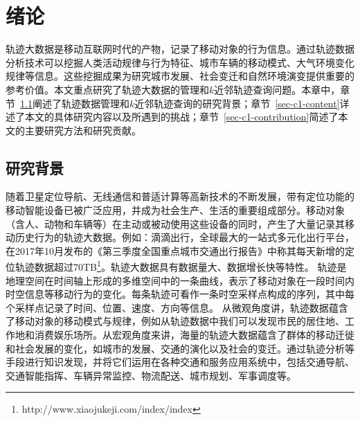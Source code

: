 \chapter{绪论}\label{capater:intro}
轨迹大数据是移动互联网时代的产物，记录了移动对象的行为信息。通过轨迹数据分析技术可以挖掘人类活动规律与行为特征、城市车辆的移动模式、大气环境变化规律等信息。这些挖掘成果为研究城市发展、社会变迁和自然环境演变提供重要的参考价值。本文重点研究了轨迹大数据的管理和$k$近邻轨迹查询问题。本章中，章节~\ref{sec-c1-background}阐述了轨迹数据管理和$k$近邻轨迹查询的研究背景；章节~\ref{sec-c1-content}详述了本文的具体研究内容以及所遇到的挑战；章节~\ref{sec-c1-contribution}简述了本文的主要研究方法和研究贡献。

\section{研究背景}\label{sec-c1-background}
        随着卫星定位导航、无线通信和普适计算等高新技术的不断发展，带有定位功能的移动智能设备已被广泛应用，并成为社会生产、生活的重要组成部分。移动对象（含人、动物和车辆等）在主动或被动使用这些设备的同时，产生了大量记录其移动历史行为的轨迹大数据。例如：滴滴出行，全球最大的一站式多元化出行平台，在2017年10月发布的《第三季度全国重点城市交通出行报告》中称其每天新增的定位轨迹数据超过70TB\footnote{http://www.xiaojukeji.com/index/index}。轨迹大数据具有数据量大、数据增长快等特性。
            轨迹是地理空间在时间轴上形成的多维空间中的一条曲线，表示了移动对象在一段时间内时空信息等移动行为的变化。每条轨迹可看作一条时空采样点构成的序列，其中每个采样点记录了时间、位置、速度、方向等信息。
             从微观角度讲，轨迹数据蕴含了移动对象的移动模式与规律\cite{Gonz2008Understanding,Song2010Limits,LiDHKN10}，例如从轨迹数据中我们可以发现市民的居住地、工作地和消费娱乐场所\cite{zzgSF}。从宏观角度来讲，海量的轨迹大数据蕴含了群体的移动迁徙和社会发展的变化，如城市的发展、交通的演化以及社会的变迁\cite{Zheng15}。通过轨迹分析等手段进行知识发现，并将它们运用在各种交通和服务应用系统中，包括交通导航\cite{QSJPredict,QSJProjection}、交通智能指挥\cite{LXX}、车辆异常监控\cite{CJY,MJLSoftware}、物流配送、城市规划、军事调度等\cite{QGD,XJJZXF,GQSurvery}。
        

